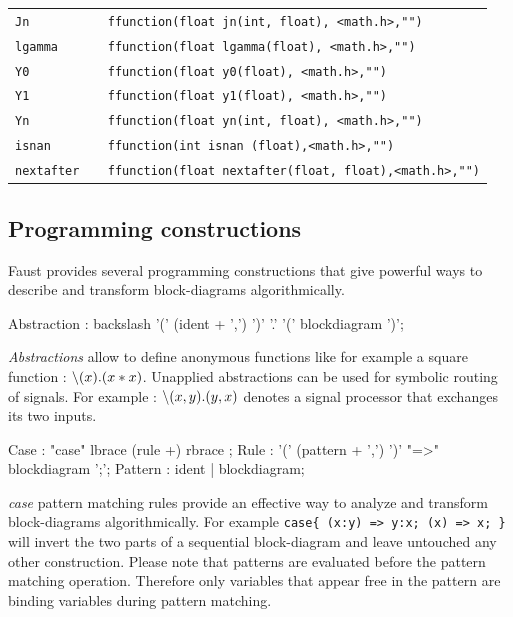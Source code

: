 \documentclass{article}
\begin{document}
\begin{tabular}{|l|l|}
\texttt{Jn			} & \texttt{ ffunction(float jn(int, float), <math.h>,"")} \\
\texttt{lgamma		} & \texttt{ ffunction(float lgamma(float), <math.h>,"")} \\
\texttt{Y0			} & \texttt{ ffunction(float y0(float), <math.h>,"")} \\
\texttt{Y1			} & \texttt{ ffunction(float y1(float), <math.h>,"")} \\
\texttt{Yn			} & \texttt{ ffunction(float yn(int, float), <math.h>,"")} \\
\texttt{isnan 		} & \texttt{ ffunction(int isnan (float),<math.h>,"")} \\
\texttt{nextafter	} & \texttt{ ffunction(float nextafter(float, float),<math.h>,"")} \\
\hline
\end{tabular}

\vspace{5 mm}

\subsection{Programming constructions}

Faust provides several programming constructions that give powerful ways to describe and transform block-diagrams algorithmically.

\begin{rail}
Abstraction :  backslash '(' (ident + ',') ')' '.' '(' blockdiagram ')';
\end{rail} 
\emph{Abstractions} allow to define anonymous functions like for example a square function : $\char"5C (x).(x*x)$. Unapplied abstractions can be used for symbolic routing of signals. For example : $\char"5C (x,y).(y,x)$ denotes a signal processor that exchanges its two inputs. 

\begin{rail}
Case :  "case" lbrace (rule +) rbrace ;
Rule : '(' (pattern + ',') ')' "=>" blockdiagram ';';
Pattern : ident | blockdiagram;
\end{rail}
\emph{case} pattern matching rules provide an effective way to analyze and transform block-diagrams algorithmically. For example \texttt{case\{ (x:y) => y:x; (x) => x; \}} will invert the two parts of a sequential block-diagram and leave untouched any other construction. Please note that patterns are evaluated before the pattern matching operation. Therefore only variables that appear free in the pattern are binding variables during pattern matching. 
\end{document}
